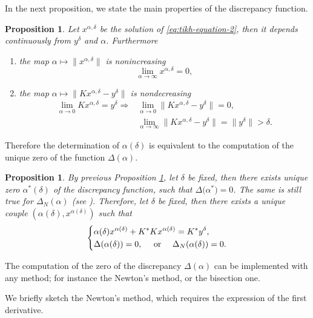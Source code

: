 \documentclass[10pt, a4paper, twoside, openright]{book}
\theoremstyle{definition}
\theoremstyle{plain}
\theoremstyle{plain}
\theoremstyle{plain}
\newtheorem{proposition}[subsection]{Proposition}
\theoremstyle{plain}
\theoremstyle{plain}
\theoremstyle{plain}
\theoremstyle{plain}
\theoremstyle{plain}
\begin{document}
In the next proposition, we state the main properties of the discrepancy function.
\begin{proposition}
\label{prop:properties-disc}
 Let $x^{\alpha,\delta}$ be the solution of \eqref{eq:tikh-equation-2}, then 
 it depends continuously from $y^\delta$ and $\alpha$. Furthermore
 \begin{enumerate}
  \item the map $\alpha\mapsto \|x^{\alpha, \delta}\|$ is nonincreasing
  \begin{equation}
   \lim_{\alpha\to\infty} x^{\alpha, \delta} = 0,
  \end{equation}
  \item the map $\alpha\mapsto \|Kx^{\alpha, \delta} - y^\delta\|$ is nondecreasing
  \begin{align}
   \lim_{\alpha\to0} Kx^{\alpha, \delta} = y^\delta \Rightarrow &\lim_{\alpha\to0}\|Kx^{\alpha, \delta} - y^\delta\| = 0,\\
   &\lim_{\alpha\to\infty}\|Kx^{\alpha, \delta} - y^\delta\| = \|y^\delta\|>\delta.
  \end{align}
 \end{enumerate}
\end{proposition}
Therefore the determination of $\alpha(\delta)$ is equivalent to the computation 
of the unique zero of the function $\Delta(\alpha)$.
\begin{proposition}
\label{prop:strategy-disc}
 By previous Proposition \ref{prop:properties-disc}, let $\delta$ be fixed, then there 
 exists unique zero $\alpha^*(\delta)$ of the discrepancy function, 
 such that $\Delta\bigl(\alpha^*\bigr)=0$. The same is still true for $\Delta_N(\alpha)$ 
 (see \cite{kirsch:shape-1998}).
 Therefore, let $\delta$ be fixed, then there exists a unique 
 couple $(\alpha(\delta), x^{\alpha(\delta)})$ such that
 \begin{equation}
  \left\{
  \begin{split}
   & \alpha(\delta) x^{\alpha(\delta)} + K^*Kx^{\alpha(\delta)} = K^*y^\delta, \\
   & \Delta(\alpha(\delta))=0, \quad\textup{ or }\quad \Delta_N(\alpha(\delta))=0.
  \end{split}
  \right.
 \end{equation}
\end{proposition}
The computation of the zero of the discrepancy $\Delta(\alpha)$ can be implemented 
with any method; for instance the Newton's method, or the bisection one.
\par
We briefly sketch the Newton's method, which requires the expression of the first derivative.
\end{document}
